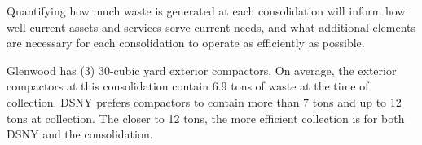 
    Quantifying how much waste is generated at each consolidation will inform how well current assets and services serve current needs, and what additional elements are necessary for each consolidation to operate as efficiently as possible.
    
    Glenwood has (3) 30-cubic yard exterior compactors. On average, the exterior compactors at this consolidation contain 6.9 tons of waste at the time of collection. DSNY prefers compactors to contain more than 7 tons and up to 12 tons at collection. The closer to 12 tons, the more efficient collection is for both DSNY and the consolidation.